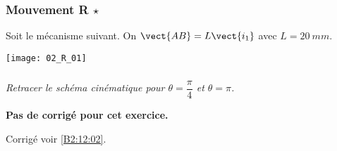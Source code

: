\normaltrue
\correctionfalse


\subsubsection{Mouvement R  $\star$ \label{B2:12:02}}
\setcounter{exo}{0}

\ifprof
\else
Soit le mécanisme suivant. On $\vect{AB}=L\vect{i_1}$ avec $L=\SI{20}{mm}$. 
\begin{center}
\texttt{[image: 02\_R\_01]}
\end{center}
\fi
\subparagraph{}
\textit{Retracer le schéma cinématique pour $\theta=\dfrac{\pi}{4}$ et $\theta=\pi$.}
\ifprof

\ifcorrection
\else
\textbf{Pas de corrigé pour cet exercice.}
\fi
\else
\fi

\ifprof
\else
\begin{flushright}
\footnotesize{Corrigé  voir \ref{B2:12:02}.}
\end{flushright}%
\fi